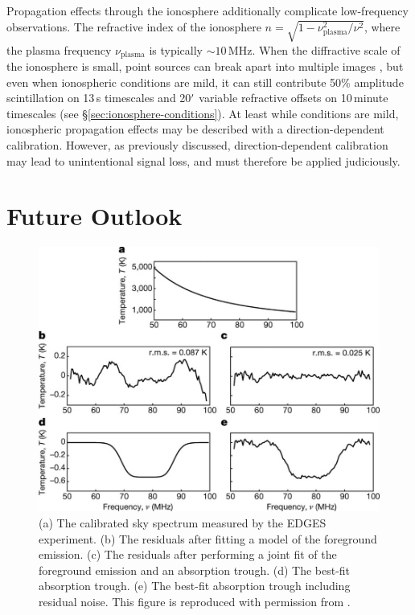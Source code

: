 \begin{bibunit}
Propagation effects through the ionosphere additionally complicate low-frequency observations. The
refractive index of the ionosphere $n = \sqrt{1 - \nu_\text{plasma}^2/\nu^2}$, where the plasma
frequency $\nu_\text{plasma}$ is typically $\sim10\,\text{MHz}$. When the diffractive scale of the
ionosphere is small, point sources can break apart into multiple images \citep{2015MNRAS.453..925V},
but even when ionospheric conditions are mild, it can still contribute 50\% amplitude scintillation
on 13\,s timescales and 20$\mbox{$^\prime$}$ variable refractive offsets on 10\,minute timescales (see
\S\ref{sec:ionosphere-conditions}).  At least while conditions are mild, ionospheric propagation
effects may be described with a direction-dependent calibration. However, as previously discussed,
direction-dependent calibration may lead to unintentional signal loss, and must therefore be applied
judiciously.

\section{Future Outlook}\label{sec:intro-future-outlook}

\begin{figure}[t]
    \centering
    \includegraphics[width=\textwidth]{figures/chapter1/bowman-2018-absorption-trough}
    \caption{
        (a) The calibrated sky spectrum measured by the EDGES experiment.
        (b) The residuals after fitting a model of the foreground emission.
        (c) The residuals after performing a joint fit of the foreground emission and an absorption
        trough.
        (d) The best-fit absorption trough.
        (e) The best-fit absorption trough including residual noise.
        This figure is reproduced with permission from \citet{2018Natur.555...67B}.
    }
    \label{fig:bowman-absorption-trough}
\end{figure}


\end{bibunit}
